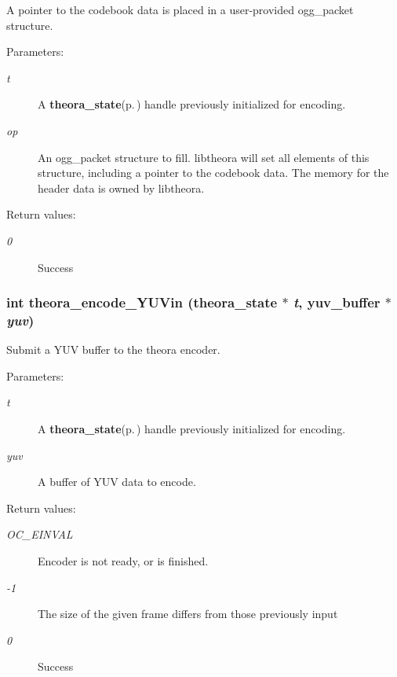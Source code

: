 A pointer to the codebook data is placed in a user-provided ogg\_\-packet structure. \begin{Desc}
\item[Parameters:]
\begin{description}
\item[{\em t}]A {\bf theora\_\-state}{\rm (p.\,\pageref{structtheora__state})} handle previously initialized for encoding. \item[{\em op}]An ogg\_\-packet structure to fill. libtheora will set all elements of this structure, including a pointer to the codebook data. The memory for the header data is owned by libtheora. \end{description}
\end{Desc}
\begin{Desc}
\item[Return values:]
\begin{description}
\item[{\em 0}]Success \end{description}
\end{Desc}
\subsubsection{\setlength{\rightskip}{0pt plus 5cm}int theora\_\-encode\_\-YUVin ({\bf theora\_\-state} $\ast$ {\em t}, {\bf yuv\_\-buffer} $\ast$ {\em yuv})}\label{theora_8h_21afcb28b49f5c775a4dbe6ab1d8b00e}


Submit a YUV buffer to the theora encoder. 

\begin{Desc}
\item[Parameters:]
\begin{description}
\item[{\em t}]A {\bf theora\_\-state}{\rm (p.\,\pageref{structtheora__state})} handle previously initialized for encoding. \item[{\em yuv}]A buffer of YUV data to encode. \end{description}
\end{Desc}
\begin{Desc}
\item[Return values:]
\begin{description}
\item[{\em OC\_\-EINVAL}]Encoder is not ready, or is finished. \item[{\em -1}]The size of the given frame differs from those previously input \item[{\em 0}]Success \end{description}
\end{Desc}
